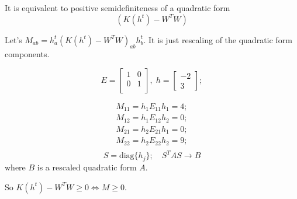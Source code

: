 \documentclass{extreport}
\begin{document}
It is equivalent to positive semidefiniteness of a quadratic form
$$(K(h^t) - W^TW)$$

Let's $M_{ab} = h_a^t (K(h^t) - W^T W)_{ab} h_b^t$.
It is just rescaling of the quadratic form components.

\[
  E =
  \begin{bmatrix}
    1 & 0 \\
    0 & 1 \\
  \end{bmatrix}, \;
  h = \begin{bmatrix} -2 \\ 3 \end{bmatrix};
\]

\begin{align*}
  M_{11} = h_1 E_{11} h_1 = 4; \\
  M_{12} = h_1 E_{12} h_2 = 0; \\
  M_{21} = h_2 E_{21} h_1 = 0; \\
  M_{22} = h_2 E_{22} h_2 = 9; \\
\end{align*}
$$ S = \text{diag}\{h_j\}; \quad S^T A S \rightarrow B$$
where $B$ is a rescaled quadratic form $A$.

So $K(h^t) - W^TW \geqslant 0 \iff M \geqslant 0$.
\end{document}
